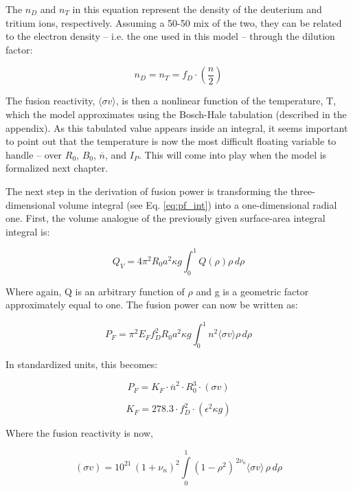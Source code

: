 \documentclass[11pt]{book}
\begin{document}
 The $n_D$ and $n_T$ in this equation represent the density of the deuterium and tritium ions, respectively. Assuming a 50-50 mix of the two, they can be related to the electron density -- i.e. the one used in this model -- through the dilution factor:
 
 \begin{equation}
 	n_D = n_T = f_D \cdot \left( \frac{n}{2} \right)
 \end{equation}
 
 The fusion reactivity, $\langle \sigma v \rangle$, is then a nonlinear function of the temperature, T, which the model approximates using the Bosch-Hale tabulation (described in the appendix). As this tabulated value appears inside an integral, it seems important to point out that the temperature is now the most difficult floating variable to handle -- over $R_0$, $B_0$, $\overline n$, and $I_P$. This will come into play when the model is formalized next chapter.
 
 The next step in the derivation of fusion power is transforming the three-dimensional volume integral (see Eq. \ref{eq:pf_int}) into a one-dimensional radial one. First, the volume analogue of the previously given surface-area integral integral is:
 
 \begin{equation}
 	Q_V = 4 \pi^2 R_0 a^2 \kappa g \int_0^1 Q(\rho) \rho \, d\rho
 \end{equation}
 
 Where again, Q is an arbitrary function of $\rho$ and g is a geometric factor approximately equal to one. The fusion power can now be written as:
 
 \begin{equation}
 	P_F = \pi^2 E_F f_D^2 R_0 a^2 \kappa g \int_0^1 n^2 \langle \sigma v \rangle \rho \, d\rho
 \end{equation}
 
 In standardized units, this becomes:
 
\begin{equation}
	\label{eq:pf}
	P_F = K_F \cdot \overline{n}^2 \cdot R_0^3  \cdot (\sigma v)
\end{equation}

\begin{equation}
  K_F = 278.3 \cdot f_D^2 \cdot ( \epsilon^2 \kappa g )
\end{equation}

Where the fusion reactivity is now,

\begin{equation}
   (\sigma v) = 10^{21} \, (1+\nu_n)^2 \int\limits_0^1 ( 1 - \rho^2 ) ^ { \, 2 \nu_n} \langle \sigma v \rangle \, \rho \, d\rho
\end{equation}
\end{document}
